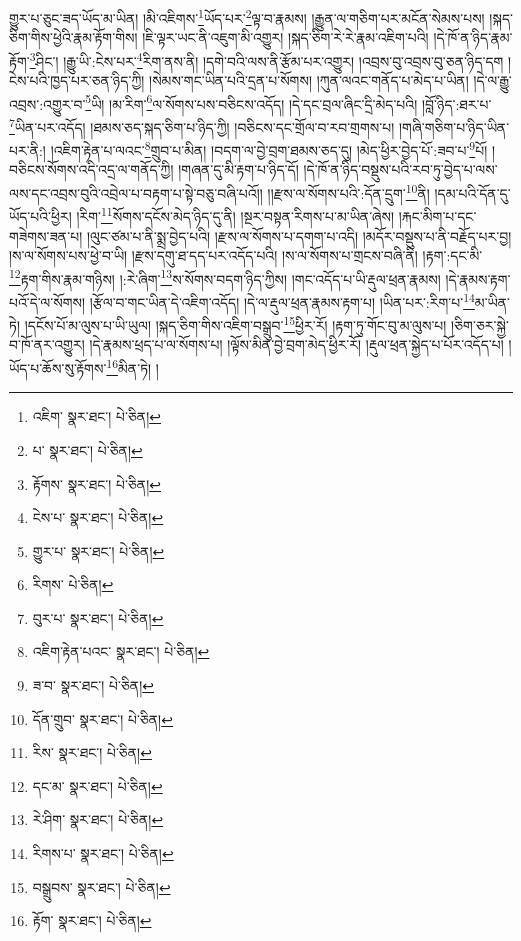 གྱུར་པ་ཅུང་ཟད་ཡོད་མ་ཡིན། །མི་འཇིགས་\footnote{འཇིག་  སྣར་ཐང་།  པེ་ཅིན། }ཡོད་པར་\footnote{པ་  སྣར་ཐང་།  པེ་ཅིན། }ལྟ་བ་རྣམས། །རྒྱུན་ལ་གཅིག་པར་མངོན་སེམས་པས། །སྐད་ཅིག་གིས་ཕྱེའི་རྣམ་རྟོག་གིས། །ཇི་ལྟར་ཡང་ནི་འཇུག་མི་འགྱུར། །སྐད་ཅིག་རེ་རེ་རྣམ་འཇིག་པའི། །དེ་ཁོ་ན་ཉིད་རྣམ་རྟོག་\footnote{རྟོགས་  སྣར་ཐང་།  པེ་ཅིན། }ཤིང་། །རྒྱུ་ཡི་:ངེས་པར་\footnote{ངེས་པ་  སྣར་ཐང་།  པེ་ཅིན། }རིག་ནས་ནི། །དགེ་བའི་ལས་ནི་རྩོམ་པར་འགྱུར། །འབྲས་བུ་འབྲས་བུ་ཅན་ཉིད་དག །ངེས་པའི་ཁྱད་པར་ཅན་ཉིད་ཀྱི། །སེམས་གང་ཡིན་པའི་དྲན་པ་སོགས། །ཀུན་ལའང་གནོད་པ་མེད་པ་ཡིན། །དེ་ལ་རྒྱུ་འབྲས་:འགྱུར་བ་\footnote{གྱུར་པ་  སྣར་ཐང་།  པེ་ཅིན། }ཡི། །མ་རིག་\footnote{རིགས་  པེ་ཅིན། }ལ་སོགས་པས་བཅིངས་འདོད། །དེ་དང་བྲལ་ཞིང་དྲི་མེད་པའི། །བློ་ཉིད་:ཐར་པ་\footnote{བུར་པ་  སྣར་ཐང་།  པེ་ཅིན། }ཡིན་པར་འདོད། །ཐམས་ཅད་སྐད་ཅིག་པ་ཉིད་ཀྱི། །བཅིངས་དང་གྲོལ་བ་རབ་གྲགས་པ། །གཞི་གཅིག་པ་ཉིད་ཡིན་པར་ནི:། །འཇིག་རྟེན་པ་ལའང་\footnote{འཇིག་རྟེན་པའང་  སྣར་ཐང་།  པེ་ཅིན། }གྲུབ་པ་མིན། །བདག་ལ་བྱེ་བྲག་ཐམས་ཅད་དུ། །མེད་ཕྱིར་བྱེད་པོ་:ཟབ་པ་\footnote{ཟ་བ་  སྣར་ཐང་།  པེ་ཅིན། }པོ། །བཅིངས་སོགས་འདི་འདྲ་ལ་གནོད་ཀྱི། །གཞན་དུ་མི་རྟག་པ་ཉིད་དོ། །དེ་ཁོ་ན་ཉིད་བསྡུས་པའི་རབ་ཏུ་བྱེད་པ་ལས་ལས་དང་འབྲས་བུའི་འབྲེལ་པ་བརྟག་པ་སྟེ་བཅུ་བཞི་པའོ།། །།རྫས་ལ་སོགས་པའི་:དོན་དྲུག་\footnote{དོན་གྲུབ་  སྣར་ཐང་།  པེ་ཅིན། }ནི། །དམ་པའི་དོན་དུ་ཡོད་པའི་ཕྱིར། །རིག་\footnote{རིས་  སྣར་ཐང་།  པེ་ཅིན། }སོགས་དངོས་མེད་ཉིད་དུ་ནི། །སྔར་བསྟན་རིགས་པ་མ་ཡིན་ཞེས། །རྐང་མིག་པ་དང་གཟེགས་ཟན་པ། །ལུང་ཙམ་པ་ནི་སྨྲ་བྱེད་པའི། །རྫས་ལ་སོགས་པ་དགག་པ་འདི། །མདོར་བསྡུས་པ་ནི་བརྗོད་པར་བྱ། །ས་ལ་སོགས་པས་ཕྱེ་བ་ཡི། །རྫས་དགུ་ཐ་དད་པར་འདོད་པའི། །ས་ལ་སོགས་པ་གྲངས་བཞི་ནི། །རྟག་:དང་མི་\footnote{དང་མ་  སྣར་ཐང་།  པེ་ཅིན། }རྟག་གིས་རྣམ་གཉིས། །:རེ་ཞིག་\footnote{རེ་ཤིག་  སྣར་ཐང་།  པེ་ཅིན། }ས་སོགས་བདག་ཉིད་ཀྱིས། །གང་འདོད་པ་ཡི་རྡུལ་ཕྲན་རྣམས། །དེ་རྣམས་རྟག་པའོ་དེ་ལ་སོགས། །རྩོལ་བ་གང་ཡིན་དེ་འཇིག་འདོད། །དེ་ལ་རྡུལ་ཕྲན་རྣམས་རྟག་པ། །ཡིན་པར་:རིག་པ་\footnote{རིགས་པ་  སྣར་ཐང་།  པེ་ཅིན། }མ་ཡིན་ཏེ། །དངོས་པོ་མ་ལུས་པ་ཡི་ཡུལ། །སྐད་ཅིག་གིས་འཇིག་བསྒྲུབ་\footnote{བསྒྲུབས་  སྣར་ཐང་།  པེ་ཅིན། }ཕྱིར་རོ། །རྟག་ཏུ་གོང་བུ་མ་ལུས་པ། །ཅིག་ཅར་སྐྱེ་བ་ཁོ་ནར་འགྱུར། །དེ་རྣམས་ཕྲད་པ་ལ་སོགས་པ། །ལྟོས་མིན་བྱེ་བྲག་མེད་ཕྱིར་རོ། །རྡུལ་ཕྲན་སྐྱེད་པ་པོར་འདོད་པ། །ཡོད་པ་ཆོས་སུ་རྟོགས་\footnote{རྟོག་  སྣར་ཐང་།  པེ་ཅིན། }མིན་ཏེ། །
